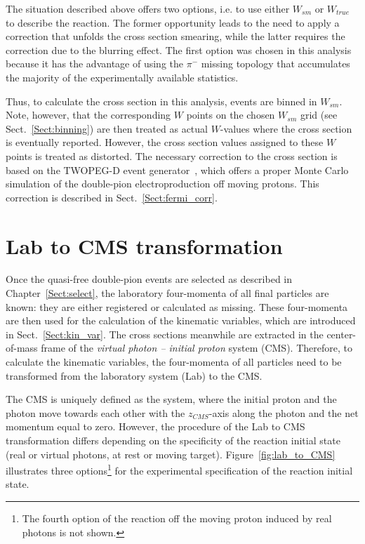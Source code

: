 The situation described above offers two options, i.e. to use either $W_{sm}$ or $W_{true}$ to describe the reaction. The former opportunity leads to the need to apply a correction that unfolds the cross section smearing, while the latter requires the correction due to the blurring effect. The first option was chosen in this analysis because it has the advantage of using the $\pi^{-}$ missing topology that accumulates the majority of the experimentally available statistics. 

Thus, to calculate the cross section in this analysis, events are binned in $W_{sm}$. Note, however, that the corresponding $W$ points on the chosen $W_{sm}$ grid (see Sect.~\ref{Sect:binning}) are then treated as actual $W$-values where the cross section is eventually reported. However, the cross section values assigned to these $W$ points is treated as distorted. The necessary correction to the cross section is based on the TWOPEG-D event generator~\cite{twopeg-d}, which offers a proper Monte Carlo simulation of the double-pion electroproduction off moving protons. This correction is described in Sect.~\ref{Sect:fermi_corr}.


\section{Lab to CMS transformation}
\label{Sect:lab_cms}

Once the quasi-free double-pion events are selected as described in Chapter~\ref{Sect:select}, the laboratory four-momenta of all final particles are known: they are either registered or calculated as missing. These four-momenta are then used for the calculation of the kinematic variables, which are introduced in Sect.~\ref{Sect:kin_var}. The cross sections meanwhile are extracted in the center-of-mass frame of the {\em virtual photon -- initial proton} system (CMS). Therefore, to calculate the kinematic variables, the four-momenta of all particles need to be transformed from the laboratory system (Lab) to the CMS.

The CMS is uniquely defined as the system, where the initial proton and the photon move towards each other with the $z_{CMS}$-axis along the photon and the net momentum equal to zero. However, the procedure of the Lab to CMS transformation differs depending on the specificity of the reaction initial state (real or virtual photons, at rest or moving target). Figure~\ref{fig:lab_to_CMS} illustrates three options\footnote[4]{The fourth option of the reaction off the moving proton induced by real photons is not shown.} for the experimental specification of the reaction initial state.%

